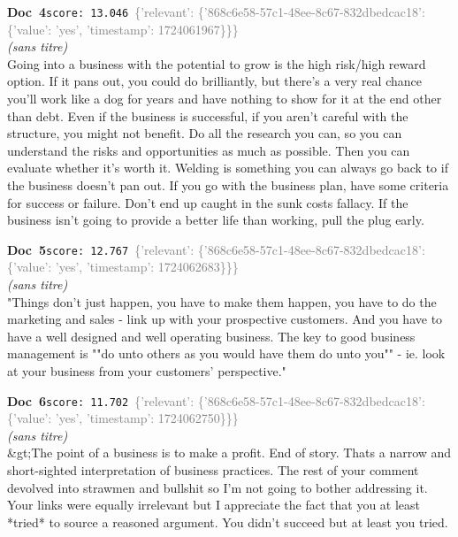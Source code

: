 \documentclass[a4paper,11pt]{article}
\begin{document}
\begin{docenv}
{\footnotesize\textcolor{doccolor}{\textbf{Doc~4}}}\hfill{\tiny\texttt{score:~13.046}}\ {\tiny\textcolor{gray}{\{'relevant': \{'868c6e58-57c1-48ee-8c67-832dbedcac18': \{'value': 'yes', 'timestamp': 1724061967\}\}\}}}\\[3pt]
{\small\textit{(sans titre)}}\\[2pt]
\vspace{2pt}
{\footnotesize 
Going into a business with the potential to grow is the high risk/high reward option. If it pans out, you could do brilliantly, but there's a very real chance you'll work like a dog for years and have nothing to show for it at the end other than debt. Even if the business is successful, if you aren't careful with the structure, you might not benefit.  Do all the research you can, so you can understand the risks and opportunities as much as possible. Then you can evaluate whether it's worth it.  Welding is something you can always go back to if the business doesn't pan out. If you go with the business plan, have some criteria for success or failure. Don't end up caught in the sunk costs fallacy. If the business isn't going to provide a better life than working, pull the plug early.}
\end{docenv}
\begin{docenv}
{\footnotesize\textcolor{doccolor}{\textbf{Doc~5}}}\hfill{\tiny\texttt{score:~12.767}}\ {\tiny\textcolor{gray}{\{'relevant': \{'868c6e58-57c1-48ee-8c67-832dbedcac18': \{'value': 'yes', 'timestamp': 1724062683\}\}\}}}\\[3pt]
{\small\textit{(sans titre)}}\\[2pt]
\vspace{2pt}
{\footnotesize 
"Things don't just happen, you have to make them happen, you have to do the marketing and sales - link up with your prospective customers. And you have to have a well designed and well operating business. The key to good business management is ""do unto others as you would have them do unto you"" - ie. look at your business from your customers' perspective."}
\end{docenv}
\begin{docenv}
{\footnotesize\textcolor{doccolor}{\textbf{Doc~6}}}\hfill{\tiny\texttt{score:~11.702}}\ {\tiny\textcolor{gray}{\{'relevant': \{'868c6e58-57c1-48ee-8c67-832dbedcac18': \{'value': 'yes', 'timestamp': 1724062750\}\}\}}}\\[3pt]
{\small\textit{(sans titre)}}\\[2pt]
\vspace{2pt}
{\footnotesize 
\&gt;The point of a business is to make a profit. End of story.  Thats a narrow and short-sighted interpretation of business practices. The rest of your comment devolved into strawmen and bullshit so I'm not going to bother addressing it. Your links were equally irrelevant but I appreciate the fact that you at least *tried* to source a reasoned argument. You didn't succeed but at least you tried.}
\end{docenv}
\end{document}
